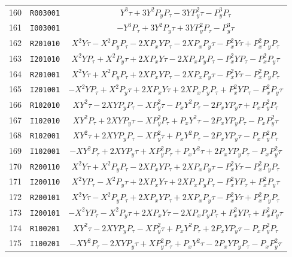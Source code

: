 {{\begin{center}
\begin{tabular}{ccc}
  160&{\tt R003001}&$Y^{3}{\tau}+3Y^{2}P_yP_{\tau}-3YP_y^{2}{\tau}-P_y^{3}P_{\tau}$\\
  161&{\tt I003001}&$-Y^{3}P_{\tau}+3Y^{2}P_y{\tau}+3YP_y^{2}P_{\tau}-P_y^{3}{\tau}$\\  162&{\tt R201010}&$X^{2}Y{\tau}-X^{2}P_yP_{\tau}-2XP_xYP_{\tau}-2XP_xP_y{\tau}-P_x^{2}Y{\tau}+P_x^{2}P_yP_{\tau}$\\  163&{\tt I201010}&$X^{2}YP_{\tau}+X^{2}P_y{\tau}+2XP_xY{\tau}-2XP_xP_yP_{\tau}-P_x^{2}YP_{\tau}-P_x^{2}P_y{\tau}$\\  164&{\tt R201001}&$X^{2}Y{\tau}+X^{2}P_yP_{\tau}+2XP_xYP_{\tau}-2XP_xP_y{\tau}-P_x^{2}Y{\tau}-P_x^{2}P_yP_{\tau}$\\  165&{\tt I201001}&$-X^{2}YP_{\tau}+X^{2}P_y{\tau}+2XP_xY{\tau}+2XP_xP_yP_{\tau}+P_x^{2}YP_{\tau}-P_x^{2}P_y{\tau}$\\  166&{\tt R102010}&$XY^{2}{\tau}-2XYP_yP_{\tau}-XP_y^{2}{\tau}-P_xY^{2}P_{\tau}-2P_xYP_y{\tau}+P_xP_y^{2}P_{\tau}$\\  167&{\tt I102010}&$XY^{2}P_{\tau}+2XYP_y{\tau}-XP_y^{2}P_{\tau}+P_xY^{2}{\tau}-2P_xYP_yP_{\tau}-P_xP_y^{2}{\tau}$\\  168&{\tt R102001}&$XY^{2}{\tau}+2XYP_yP_{\tau}-XP_y^{2}{\tau}+P_xY^{2}P_{\tau}-2P_xYP_y{\tau}-P_xP_y^{2}P_{\tau}$\\  169&{\tt I102001}&$-XY^{2}P_{\tau}+2XYP_y{\tau}+XP_y^{2}P_{\tau}+P_xY^{2}{\tau}+2P_xYP_yP_{\tau}-P_xP_y^{2}{\tau}$\\  170&{\tt R200110}&$X^{2}Y{\tau}+X^{2}P_yP_{\tau}-2XP_xYP_{\tau}+2XP_xP_y{\tau}-P_x^{2}Y{\tau}-P_x^{2}P_yP_{\tau}$\\  171&{\tt I200110}&$X^{2}YP_{\tau}-X^{2}P_y{\tau}+2XP_xY{\tau}+2XP_xP_yP_{\tau}-P_x^{2}YP_{\tau}+P_x^{2}P_y{\tau}$\\  172&{\tt R200101}&$X^{2}Y{\tau}-X^{2}P_yP_{\tau}+2XP_xYP_{\tau}+2XP_xP_y{\tau}-P_x^{2}Y{\tau}+P_x^{2}P_yP_{\tau}$\\  173&{\tt I200101}&$-X^{2}YP_{\tau}-X^{2}P_y{\tau}+2XP_xY{\tau}-2XP_xP_yP_{\tau}+P_x^{2}YP_{\tau}+P_x^{2}P_y{\tau}$\\  174&{\tt R100201}&$XY^{2}{\tau}-2XYP_yP_{\tau}-XP_y^{2}{\tau}+P_xY^{2}P_{\tau}+2P_xYP_y{\tau}-P_xP_y^{2}P_{\tau}$\\  175&{\tt I100201}&$-XY^{2}P_{\tau}-2XYP_y{\tau}+XP_y^{2}P_{\tau}+P_xY^{2}{\tau}-2P_xYP_yP_{\tau}-P_xP_y^{2}{\tau}$
\end{tabular}



\end{center}}}
